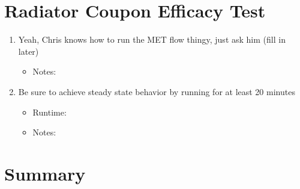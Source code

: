 \documentclass[11pt]{article}
\begin{document}
    \section{Radiator Coupon Efficacy Test}
        \begin{enumerate}
            \item Yeah, Chris knows how to run the MET flow thingy, just ask him (fill in later)
            \begin{itemize}
                \item Notes: 
            \end{itemize}
            \item Be sure to achieve steady state behavior by running for at least 20 minutes
            \begin{itemize}
                \item Runtime: 
                \item Notes: 
            \end{itemize}
        \end{enumerate}

    \newpage

    \section{Summary}

    \appendix
\end{document}
